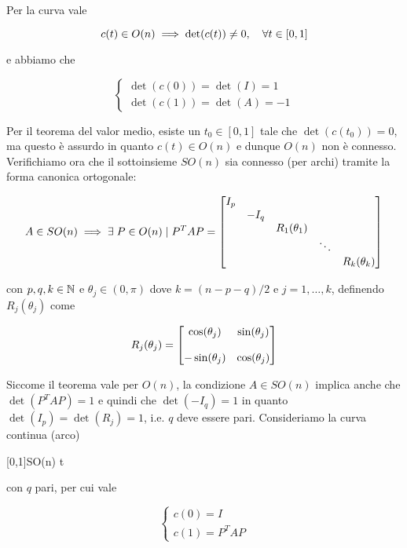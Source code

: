 Per la curva vale

\begin{equation}
	c(t) \in O(n) \implies \det(c(t)) \neq 0 \qcomma \forall t \in [0,1]
\end{equation}

e abbiamo che

\begin{equation}
	\begin{cases}
		\det(c(0)) = \det(I) = 1 \\
		\det(c(1)) = \det(A) = - 1
	\end{cases}
\end{equation}

Per il teorema del valor medio, esiste un $ t_{0} \in [0,1] $ tale che $ \det(c(t_{0})) = 0 $, ma questo è assurdo in quanto $ c(t) \in O(n) $ e dunque $ O(n) $ non è connesso.\\
Verifichiamo ora che il sottoinsieme $ SO(n) $ sia connesso (per archi) tramite la forma canonica ortogonale:

\begin{equation}
	A \in SO(n) %
	\implies %
	\E P \in O(n) \mid P^{T} A P = %
	\bmqty{ %
			\dmat{ %
					I_{p}, %
					- I_{q}, %
					R_{1}(\theta_{1}), %
					\ddots, %
					R_{k}(\theta_{k}) %
					} %
			}
\end{equation}

con $ p,q,k \in \mathbb{N} $ e $ \theta_{j} \in (0,\pi) $ dove $ k = (n-p-q)/2 $ e $ j=1,\dots,k $, definendo $ R_{j}(\theta_{j}) $ come

\begin{equation}
	R_{j}(\theta_{j}) = %
	\bmqty{ %
			\cos(\theta_{j}) & \sin(\theta_{j}) \\\\
			- \sin(\theta_{j}) & \cos(\theta_{j}) %
			}
\end{equation}

Siccome il teorema vale per $ O(n) $, la condizione $ A \in SO(n) $ implica anche che $ \det(P^{T} A P) = 1 $ e quindi che $ \det(-I_{q}) = 1 $ in quanto $ \det(I_{p}) = \det(R_{j}) = 1 $, i.e. $ q $ deve essere pari. Consideriamo la curva continua (arco)

	{[0,1]}{SO(n)}
	{t}{ %
		}

con $ q $ pari, per cui vale

\begin{equation}
	\begin{cases}
		c(0) = I \\
		c(1) = P^{T} A P
	\end{cases}
\end{equation}

